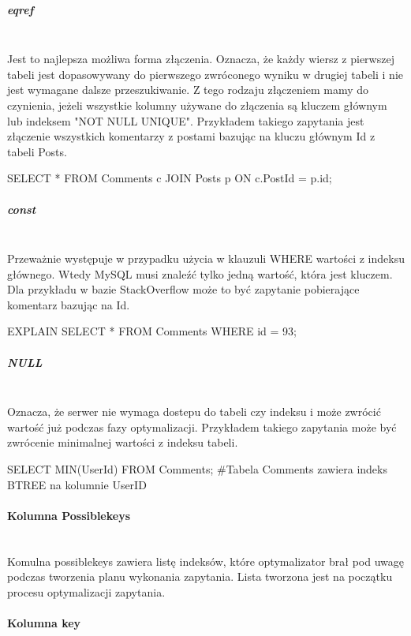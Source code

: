 \subparagraph{eq\textunderscore ref}\leavevmode\\

Jest to najlepsza możliwa forma złączenia. Oznacza, że każdy wiersz z pierwszej tabeli jest dopasowywany do pierwszego zwróconego wyniku w drugiej tabeli i nie jest wymagane dalsze przeszukiwanie. Z tego rodzaju złączeniem mamy do czynienia, jeżeli wszystkie kolumny używane do złączenia są kluczem głównym lub indeksem "NOT NULL UNIQUE". Przykładem takiego zapytania jest złączenie wszystkich komentarzy z postami bazując na kluczu głównym Id z tabeli Posts. 

\begin{spverbatim}
	SELECT * FROM Comments c JOIN Posts p ON c.PostId = p.id;
\end{spverbatim}

\subparagraph{const}\leavevmode\\
Przeważnie występuje w przypadku użycia w klauzuli WHERE wartości z indeksu głównego. Wtedy MySQL musi znaleźć tylko jedną wartość, która jest kluczem. Dla przykładu w bazie StackOverflow może to być zapytanie pobierające komentarz bazując na Id.
\begin{spverbatim}
	EXPLAIN SELECT * FROM Comments WHERE id = 93;
\end{spverbatim}

\subparagraph{NULL}\leavevmode\\
Oznacza, że serwer nie wymaga dostepu do tabeli czy indeksu i może zwrócić wartość już podczas fazy optymalizacji. Przykładem takiego zapytania może być zwrócenie minimalnej wartości z indeksu tabeli.

\begin{spverbatim}
	SELECT MIN(UserId) FROM Comments;
	#Tabela Comments zawiera indeks BTREE na kolumnie UserID
\end{spverbatim}

\paragraph{Kolumna Possible\textunderscore keys}\leavevmode\\

Komulna possible\textunderscore keys zawiera listę indeksów, które optymalizator brał pod uwagę podczas tworzenia planu wykonania zapytania. Lista tworzona jest na początku procesu optymalizacji zapytania.

\paragraph{Kolumna key}\leavevmode\\

